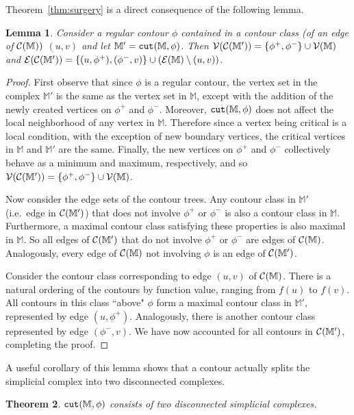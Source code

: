 \documentclass[11pt]{article}
\newtheorem{theorem}{Theorem}[section]
\newtheorem{lemma}[theorem]{Lemma}
\theoremstyle{definition}
\newcommand{\cC}{{\cal C}}
\newcommand{\cE}{{\cal E}}
\newcommand{\cV}{{\cal V}}
\newcommand{\MM}{\mathbb{M}}
\newcommand{\cut}{{\tt cut}}
\newcommand{\reeb}{\cC}
\begin{document}
Theorem~\ref{thm:surgery} is a direct consequence of the following lemma. 

\begin{lemma} \label{lem:cut} Consider a regular contour $\phi$ contained in a contour class (of an edge of $\reeb(\MM))$
$(u,v)$ and let $\MM' = \cut(\MM,\phi)$. Then $\cV(\reeb(\MM')) = \{\phi^+,\phi^-\} \cup \cV(\MM)$
and $\cE(\reeb(\MM')) = \{(u,\phi^+),(\phi^-,v)\} \cup (\cE(\MM) \setminus (u,v))$.
\end{lemma}

\begin{proof} First observe that since $\phi$ is a regular contour, the vertex set in the complex $\MM'$ is the same 
as the vertex set in $\MM$, except with the addition of the newly created vertices on $\phi^+$ and $\phi^-$.  
Moreover, $\cut(\MM,\phi)$ does not affect the local neighborhood of any vertex in $\MM$. 
Therefore since a vertex being critical is a local condition, with the exception of new boundary vertices, the 
critical vertices in $\MM$ and $\MM'$ are the same.  Finally, the new vertices on $\phi^+$ and $\phi^-$ 
collectively behave as a minimum and maximum, respectively, and so $\cV(\reeb(\MM')) = \{\phi^+,\phi^-\} \cup \cV(\MM)$.

Now consider the edge sets of the contour trees.  Any contour class in $\MM'$ (i.e.\ edge in $\cC(\MM')$) that does not involve $\phi^+$ or $\phi^-$ is also
a contour class in $\MM$. Furthermore, a maximal contour class satisfying these properties is also
maximal in $\MM$. So all edges of $\cC(\MM')$ that do not involve $\phi^+$ or $\phi^-$ are edges of $\cC(\MM)$.
Analogously, every edge of $\cC(\MM)$ not involving $\phi$ is an edge of $\cC(\MM')$.

Consider the contour class corresponding to edge $(u,v)$ of $\cC(\MM)$. There is a natural ordering
of the contours by function value, ranging from $f(u)$ to $f(v)$. All contours in this class ``above" $\phi$
form a maximal contour class in $\MM'$, represented by edge $(u,\phi^+)$. Analogously, there is another
contour class represented by edge $(\phi^-,v)$. We have now accounted for all contours in $\cC(\MM')$,
completing the proof.
\end{proof}

A useful corollary of this lemma shows that a contour actually splits the simplicial complex into
two disconnected complexes.

\begin{theorem} \label{thm:jordan} $\cut(\MM,\phi)$ consists of two
disconnected simplicial complexes.
\end{theorem}
\end{document}

